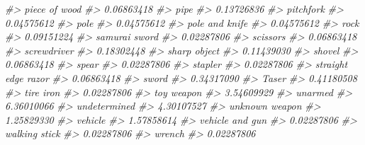 \documentclass[
]{krantz}
\makeatletter
\newenvironment{Shaded}{\begin{snugshade}}{\end{snugshade}}
\newcommand{\CommentTok}[1]{\textcolor[rgb]{0.37,0.37,0.37}{\textit{#1}}}
\newenvironment{kframe}{%
\medskip{}
\setlength{\fboxsep}{.8em}
 \def\at@end@of@kframe{}%
 \ifinner\ifhmode%
  \def\at@end@of@kframe{\end{minipage}}%
  \begin{minipage}{\columnwidth}%
 \fi\fi%
 \def\FrameCommand##1{\hskip\@totalleftmargin \hskip-\fboxsep
 \colorbox{shadecolor}{##1}\hskip-\fboxsep
     \hskip-\linewidth \hskip-\@totalleftmargin \hskip\columnwidth}%
 \MakeFramed {\advance\hsize-\width
   \@totalleftmargin\z@ \linewidth\hsize
   \@setminipage}}%
 {\par\unskip\endMakeFramed%
 \at@end@of@kframe}
\renewenvironment{Shaded}{\begin{kframe}}{\end{kframe}}
\makeatother
\begin{document}
\begin{Shaded}
\begin{Highlighting}[]
\CommentTok{\#\textgreater{}                    piece of wood }
\CommentTok{\#\textgreater{}                       0.06863418 }
\CommentTok{\#\textgreater{}                             pipe }
\CommentTok{\#\textgreater{}                       0.13726836 }
\CommentTok{\#\textgreater{}                        pitchfork }
\CommentTok{\#\textgreater{}                       0.04575612 }
\CommentTok{\#\textgreater{}                             pole }
\CommentTok{\#\textgreater{}                       0.04575612 }
\CommentTok{\#\textgreater{}                   pole and knife }
\CommentTok{\#\textgreater{}                       0.04575612 }
\CommentTok{\#\textgreater{}                             rock }
\CommentTok{\#\textgreater{}                       0.09151224 }
\CommentTok{\#\textgreater{}                    samurai sword }
\CommentTok{\#\textgreater{}                       0.02287806 }
\CommentTok{\#\textgreater{}                         scissors }
\CommentTok{\#\textgreater{}                       0.06863418 }
\CommentTok{\#\textgreater{}                      screwdriver }
\CommentTok{\#\textgreater{}                       0.18302448 }
\CommentTok{\#\textgreater{}                     sharp object }
\CommentTok{\#\textgreater{}                       0.11439030 }
\CommentTok{\#\textgreater{}                           shovel }
\CommentTok{\#\textgreater{}                       0.06863418 }
\CommentTok{\#\textgreater{}                            spear }
\CommentTok{\#\textgreater{}                       0.02287806 }
\CommentTok{\#\textgreater{}                          stapler }
\CommentTok{\#\textgreater{}                       0.02287806 }
\CommentTok{\#\textgreater{}              straight edge razor }
\CommentTok{\#\textgreater{}                       0.06863418 }
\CommentTok{\#\textgreater{}                            sword }
\CommentTok{\#\textgreater{}                       0.34317090 }
\CommentTok{\#\textgreater{}                            Taser }
\CommentTok{\#\textgreater{}                       0.41180508 }
\CommentTok{\#\textgreater{}                        tire iron }
\CommentTok{\#\textgreater{}                       0.02287806 }
\CommentTok{\#\textgreater{}                       toy weapon }
\CommentTok{\#\textgreater{}                       3.54609929 }
\CommentTok{\#\textgreater{}                          unarmed }
\CommentTok{\#\textgreater{}                       6.36010066 }
\CommentTok{\#\textgreater{}                     undetermined }
\CommentTok{\#\textgreater{}                       4.30107527 }
\CommentTok{\#\textgreater{}                   unknown weapon }
\CommentTok{\#\textgreater{}                       1.25829330 }
\CommentTok{\#\textgreater{}                          vehicle }
\CommentTok{\#\textgreater{}                       1.57858614 }
\CommentTok{\#\textgreater{}                  vehicle and gun }
\CommentTok{\#\textgreater{}                       0.02287806 }
\CommentTok{\#\textgreater{}                    walking stick }
\CommentTok{\#\textgreater{}                       0.02287806 }
\CommentTok{\#\textgreater{}                           wrench }
\CommentTok{\#\textgreater{}                       0.02287806}
\end{Highlighting}
\end{Shaded}
\end{document}
